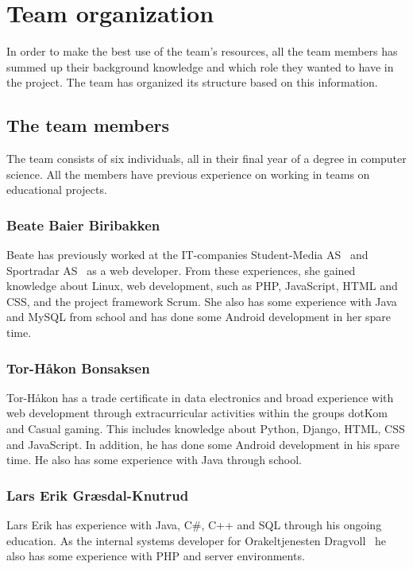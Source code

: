 \section{Team organization}
In order to make the best use of the team's resources, all the team members has summed up their background knowledge and which role they wanted to have in the project. The team has organized its structure based on this information.

\subsection{The team members}
The team consists of six individuals, all in their final year of a degree in computer science. All the members have previous experience on working in teams on educational projects.

\subsubsection{Beate Baier Biribakken}
Beate has previously worked at the IT-companies Student-Media AS~\cite{studentmedia} and Sportradar AS~\cite{sportradar} as a web developer. From these experiences, she gained knowledge about Linux, web development, such as PHP, JavaScript, HTML and CSS, and the project framework Scrum. She also has some experience with Java and MySQL from school and has done some Android development in her spare time.

\subsubsection{Tor-Håkon Bonsaksen}
Tor-Håkon has a trade certificate in data electronics and broad experience with web development through extracurricular activities within the groups dotKom~\cite{dotkom} and Casual gaming\cite{casualgaming}. This includes knowledge about Python, Django, HTML, CSS and JavaScript. In addition, he has done some Android development in his spare time. He also has some experience with Java through school.

\subsubsection{Lars Erik Græsdal-Knutrud}
Lars Erik has experience with Java, C\#, C++ and SQL through his ongoing education. As the internal systems developer for Orakeltjenesten Dragvoll~\cite{orakeltjenesten} he also has some experience with PHP and server environments. 

